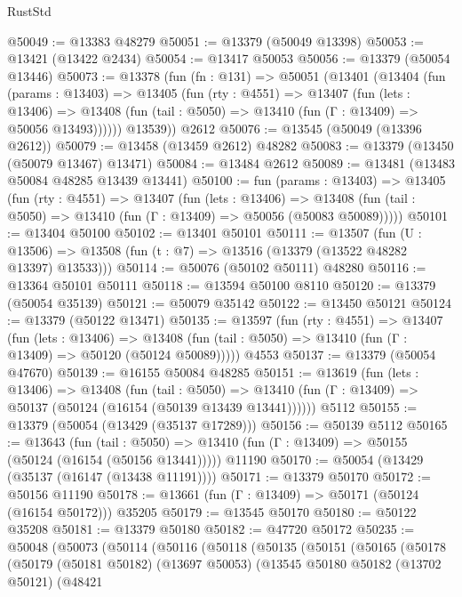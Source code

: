 \begin{lexlean}{RustStd}
\begin{coremodule}
@50049 := @13383 @48279
@50051 := @13379 (@50049 @13398)
@50053 := @13421 (@13422 @2434)
@50054 := @13417 @50053
@50056 := @13379 (@50054 @13446)
@50073 := @13378
    (fun (fn : @131) =>
    @50051
      (@13401
        (@13404
          (fun (params : @13403) =>
          @13405
            (fun (rty : @4551) =>
            @13407
              (fun (lets : @13406) =>
              @13408 (fun (tail : @5050) => @13410 (fun (Γ : @13409) => @50056 @13493))))))
        @13539))
    @2612
@50076 := @13545 (@50049 (@13396 @2612))
@50079 := @13458 (@13459 @2612) @48282
@50083 := @13379 (@13450 (@50079 @13467) @13471)
@50084 := @13484 @2612
@50089 := @13481 (@13483 @50084 @48285 @13439 @13441)
@50100 := fun (params : @13403) =>
  @13405
    (fun (rty : @4551) =>
    @13407
      (fun (lets : @13406) =>
      @13408 (fun (tail : @5050) => @13410 (fun (Γ : @13409) => @50056 (@50083 @50089)))))
@50101 := @13404 @50100
@50102 := @13401 @50101
@50111 := @13507
    (fun (U : @13506) => @13508 (fun (t : @7) => @13516 (@13379 (@13522 @48282 @13397) @13533)))
@50114 := @50076 (@50102 @50111) @48280
@50116 := @13364 @50101 @50111
@50118 := @13594 @50100 @8110
@50120 := @13379 (@50054 @35139)
@50121 := @50079 @35142
@50122 := @13450 @50121
@50124 := @13379 (@50122 @13471)
@50135 := @13597
    (fun (rty : @4551) =>
    @13407
      (fun (lets : @13406) =>
      @13408 (fun (tail : @5050) => @13410 (fun (Γ : @13409) => @50120 (@50124 @50089)))))
    @4553
@50137 := @13379 (@50054 @47670)
@50139 := @16155 @50084 @48285
@50151 := @13619
    (fun (lets : @13406) =>
    @13408
      (fun (tail : @5050) =>
      @13410 (fun (Γ : @13409) => @50137 (@50124 (@16154 (@50139 @13439 @13441))))))
    @5112
@50155 := @13379 (@50054 (@13429 (@35137 @17289)))
@50156 := @50139 @5112
@50165 := @13643
    (fun (tail : @5050) => @13410 (fun (Γ : @13409) => @50155 (@50124 (@16154 (@50156 @13441)))))
    @11190
@50170 := @50054 (@13429 (@35137 (@16147 (@13438 @11191))))
@50171 := @13379 @50170
@50172 := @50156 @11190
@50178 := @13661 (fun (Γ : @13409) => @50171 (@50124 (@16154 @50172))) @35205
@50179 := @13545 @50170
@50180 := @50122 @35208
@50181 := @13379 @50180
@50182 := @47720 @50172
@50235 := @50048
    (@50073
      (@50114
        (@50116
          (@50118
            (@50135
              (@50151
                (@50165
                  (@50178
                    (@50179
                      (@50181 @50182)
                      (@13697 @50053)
                      (@13545
                        @50180
                        @50182
                        (@13702 @50121)
                        (@48421

\end{coremodule}
\end{lexlean}
